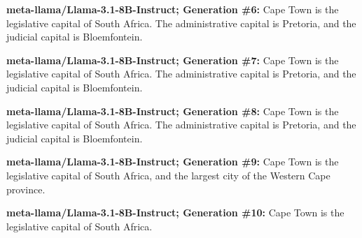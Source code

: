 \documentclass{article} %
\newcommand{\known}[1]{\textcolor{KnownGreen}{#1}}
\begin{document}
\begin{tcolorbox}[
    colback=white,
    colframe=lightblue,
    arc=10pt,
    boxrule=3pt,
    left=10pt,
    right=10pt,
    top=10pt,
    bottom=10pt
]
\noindent\faRobot \hspace{5pt} \textbf{meta-llama/Llama-3.1-8B-Instruct; Generation \#6:}
Cape Town is the legislative capital of \known{South Africa}. The administrative capital is Pretoria, and the judicial capital is Bloemfontein.
\vspace{8pt}

\noindent\faRobot \hspace{5pt} \textbf{meta-llama/Llama-3.1-8B-Instruct; Generation \#7:}
Cape Town is the legislative capital of \known{South Africa}. The administrative capital is Pretoria, and the judicial capital is Bloemfontein.
\vspace{8pt}

\noindent\faRobot \hspace{5pt} \textbf{meta-llama/Llama-3.1-8B-Instruct; Generation \#8:}
Cape Town is the legislative capital of \known{South Africa}. The administrative capital is Pretoria, and the judicial capital is Bloemfontein.
\vspace{8pt}

\noindent\faRobot \hspace{5pt} \textbf{meta-llama/Llama-3.1-8B-Instruct; Generation \#9:}
Cape Town is the legislative capital of \known{South Africa}, and the largest city of the Western Cape province.
\vspace{8pt}

\noindent\faRobot \hspace{5pt} \textbf{meta-llama/Llama-3.1-8B-Instruct; Generation \#10:}
Cape Town is the legislative capital of \known{South Africa}.
\end{tcolorbox}
\end{document}
